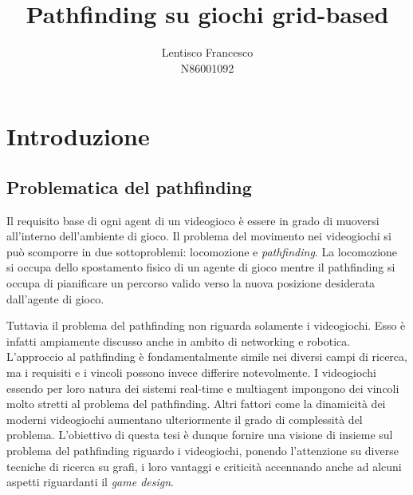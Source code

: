 \documentclass[12pt]{book}
\title{\textbf{Pathfinding su giochi grid-based}}
\author{Lentisco Francesco\\
N86001092}
\date{}
\begin{document}
\onehalfspacing
\maketitle


\chapter{Introduzione}
\section{Problematica del pathfinding}
\par{Il requisito base di ogni agent di un videogioco \`e essere in grado di muoversi all'interno dell'ambiente di gioco. Il problema del movimento nei videogiochi si pu\`o scomporre in due sottoproblemi: locomozione e \emph{pathfinding}. La locomozione si occupa dello spostamento fisico di un agente di gioco mentre il pathfinding si occupa di pianificare un percorso valido verso la nuova posizione desiderata dall'agente di gioco.}
\par{Tuttavia il problema del pathfinding non riguarda solamente i videogiochi. Esso \`e infatti ampiamente discusso anche in ambito di networking e robotica. L'approccio al pathfinding \`e fondamentalmente simile nei diversi campi di ricerca, ma i requisiti e i vincoli possono invece differire notevolmente. I videogiochi essendo per loro natura dei sistemi real-time e multiagent impongono dei vincoli molto stretti al problema del pathfinding. Altri fattori come la dinamicit\`a dei moderni videogiochi aumentano ulteriormente il grado di complessit\`a del problema. L'obiettivo di questa tesi \`e dunque fornire una visione di insieme sul problema del pathfinding riguardo i videogiochi, ponendo l'attenzione su diverse tecniche di ricerca su grafi, i loro vantaggi e criticit\`a accennando anche ad alcuni aspetti riguardanti il \emph{game design}.}
\end{document}

